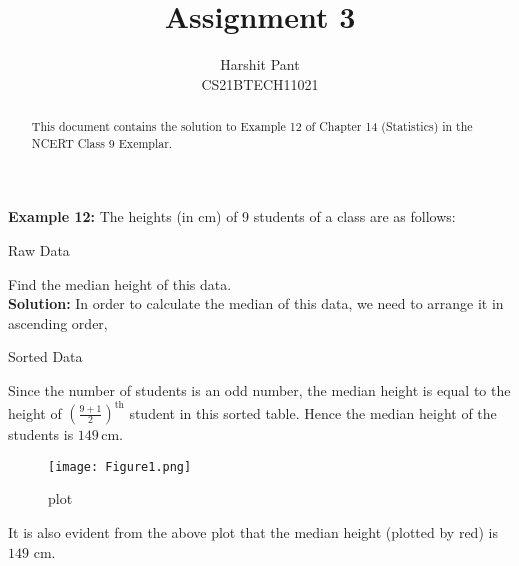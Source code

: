 \documentclass[journal,12pt,twocolumn]{IEEEtran}
\title{Assignment 3}
\author{Harshit Pant\\CS21BTECH11021}
\date{}
\providecommand{\brak}[1]{\ensuremath{\left(#1\right)}}
\begin{document}
\maketitle
\begin{abstract}
This document contains the solution to Example 12 of Chapter 14 (Statistics) in the NCERT Class 9 Exemplar.
\end{abstract}
\textbf{Example 12:}	The heights (in cm) of 9 students of a class are as follows:\\

\begin{table}[!htb]

\caption{Raw Data}
\label{table:raw}
\end{table}
Find the median height of this data.\\

\textbf{Solution: }In order to calculate the median of this data, we need to arrange it in ascending order,\\
\begin{table}[!htb]
\centering

\caption{Sorted Data}
\label{table:sort}
\end{table}

Since the number of students is an odd number, the median height is equal to the height of $\brak{\frac{9+1}{2}}^{\text{th}}$ student in this sorted table.
Hence the median height of the students is $149\,$cm.
\begin{figure}[H]
\centering 
\texttt{[image: Figure1.png]}
\caption{plot}
\label{fig:plot}
\end{figure}
It is also evident from the above plot that the median height (plotted by red) is $149$ cm.
\end{document}
